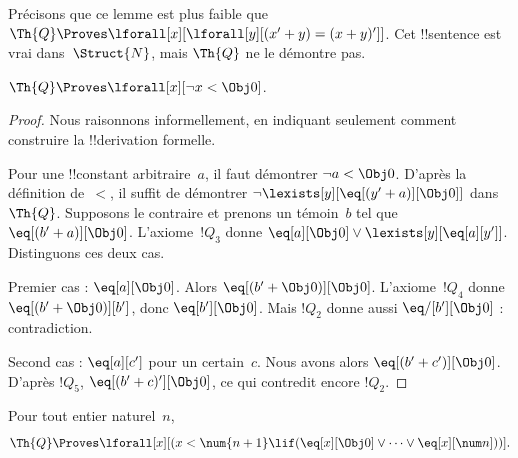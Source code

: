 \documentclass[../../../include/open-logic-section]{subfiles}
\begin{document}
Précisons que ce lemme est plus faible que
$\Th{Q}\Proves\lforall[x][\lforall[y][(x'+y)=(x+y)']]$.
Cet !!{sentence} est vrai dans~$\Struct{N}$, mais
$\Th{Q}$ ne le démontre pas.

\begin{lem}
$\Th{Q} \Proves \lforall[x][\lnot x < \Obj 0]$.
\end{lem}

\begin{proof}
Nous raisonnons informellement, en indiquant seulement comment
construire la !!{derivation} formelle.

Pour une !!{constant} arbitraire~$a$, il faut démontrer
$\lnot a<\Obj 0$. D'après la définition de~$<$, il suffit de
démontrer $\lnot\lexists[y][\eq[(y'+a)][\Obj 0]]$ dans~$\Th{Q}$.
Supposons le contraire et prenons un témoin~$b$ tel que
$\eq[(b'+a)][\Obj 0]$. L'axiome~$!Q_3$ donne
$\eq[a][\Obj 0]\lor\lexists[y][\eq[a][y']]$.
Distinguons ces deux cas.

Premier cas : $\eq[a][\Obj 0]$. Alors
$\eq[(b'+\Obj 0)][\Obj 0]$. L'axiome~$!Q_4$ donne
$\eq[(b'+\Obj 0)][b']$, donc $\eq[b'][\Obj 0]$.
Mais $!Q_2$ donne aussi $\eq/[b'][\Obj 0]$ : contradiction.

Second cas : $\eq[a][c']$ pour un certain~$c$. Nous avons
alors $\eq[(b'+c')][\Obj 0]$. D'après $!Q_5$,
$\eq[(b'+c)'][\Obj 0]$, ce qui contredit encore $!Q_2$.
\end{proof}

\begin{lem}
Pour tout entier naturel~$n$,
\[
  \Th{Q} \Proves
  \lforall[x][(x < \num {n+1} \lif (\eq[x][\Obj 0] \lor \dots \lor
    \eq[x][\num n]))].
\]
\end{lem}
\end{document}
